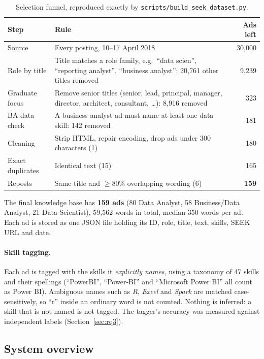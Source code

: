 \begin{table}[H]
\caption{Selection funnel, reproduced exactly by \texttt{scripts/build\_seek\_dataset.py}.}\label{tab:funnel}
\small
\begin{tabularx}{\linewidth}{lYr}
\toprule
Step & Rule & Ads left \\
\midrule
Source & Every posting, 10--17 April 2018 & 30,000 \\
Role by title & Title matches a role family, e.g.\ ``data scien'', ``reporting analyst'', ``business analyst''; 20,761 other titles removed & 9,239 \\
Graduate focus & Remove senior titles (senior, lead, principal, manager, director, architect, consultant, \dots): 8,916 removed & 323 \\
BA data check & A business analyst ad must name at least one data skill: 142 removed & 181 \\
Cleaning & Strip HTML, repair encoding, drop ads under 300 characters (1) & 180 \\
Exact duplicates & Identical text (15) & 165 \\
Reposts & Same title and $\geq$80\% overlapping wording (6) & \textbf{159} \\
\bottomrule
\end{tabularx}
\end{table}

The final knowledge base has \textbf{159 ads} (80 Data Analyst, 58 Business/Data Analyst, 21 Data Scientist), 59,562 words in total, median 350 words per ad. Each ad is stored as one JSON file holding its ID, role, title, text, skills, SEEK URL and date.

\paragraph{Skill tagging.} Each ad is tagged with the skills it \emph{explicitly names}, using a taxonomy of 47 skills and their spellings (``PowerBI'', ``Power-BI'' and ``Microsoft Power BI'' all count as Power BI). Ambiguous names such as \emph{R}, \emph{Excel} and \emph{Spark} are matched case-sensitively, so ``r'' inside an ordinary word is not counted. Nothing is inferred: a skill that is not named is not tagged. The tagger's accuracy was measured against independent labels (Section~\ref{sec:rq3}).

\subsection{System overview}

